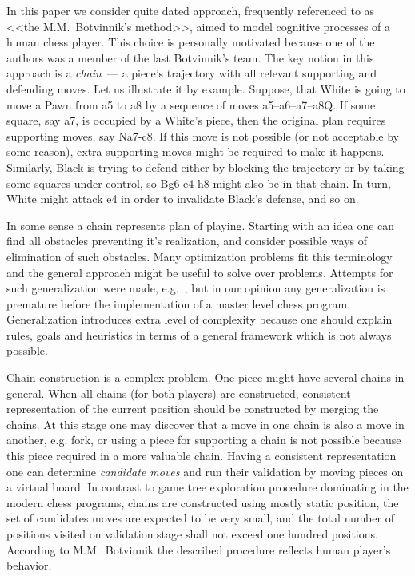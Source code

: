 \documentclass{llncs}
\begin{document}
In this paper we consider quite dated approach, frequently referenced to
as <<the M.M.~Botvinnik's method>>, aimed to model cognitive processes
of a human chess player. This choice is personally motivated because
one of the authors was a member of the last Botvinnik's team.  The key
notion in this approach is a \emph{chain}~--- a piece's trajectory
with all relevant supporting and defending moves. Let us illustrate it
by example. Suppose, that White is going to move a Pawn from a5 to a8
by a sequence of moves a5--a6--a7--a8Q. If some square, say a7, is
occupied by a White's piece, then the original plan requires
supporting moves, say Na7-c8. If this move is not possible (or not
acceptable by some reason), extra supporting moves might be required
to make it happens. Similarly, Black is trying to defend either by
blocking the trajectory or by taking some squares under control, so
Bg6-e4-h8 might also be in that chain. In turn, White might attack e4
in order to invalidate Black's defense, and so on.

In some sense a chain represents plan of playing. Starting with an
idea one can find all obstacles preventing it's realization, and
consider possible ways of elimination of such obstacles. Many
optimization problems fit this terminology and the general approach
might be useful to solve over problems. Attempts for such
generalization were made, e.g.~\cite{Botvinnik:1984,Botvinnik1970,Stilman:2000:LGS},
but in our opinion any generalization is premature before the
implementation of a master level chess program. Generalization
introduces extra level of complexity because one should explain rules,
goals and heuristics in terms of a general framework which is not
always possible.

Chain construction is a complex problem. One piece might have several
chains in general. When all chains (for both players) are constructed,
consistent representation of the current position should be
constructed by merging the chains. At this stage one may discover that
a move in one chain is also a move in another, e.g. fork, or using a
piece for supporting a chain is not possible because this piece
required in a more valuable chain. Having a consistent representation
one can determine \emph{candidate moves} and run their validation by
moving pieces on a virtual board.
%
In contrast to game tree exploration procedure dominating in the
modern chess programs, chains are constructed using mostly static
position, the set of candidates moves are expected to be very small,
and the total number of positions visited on validation stage shall
not exceed one hundred positions. According to M.M.~Botvinnik the
described procedure reflects human player's behavior.
\end{document}

